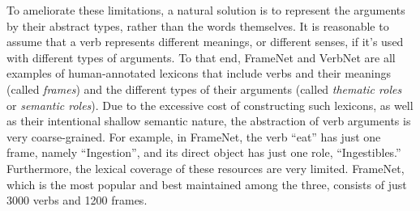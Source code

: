 To ameliorate these limitations, a natural solution is to represent the
arguments by their abstract types, rather than the words themselves.
It is reasonable to assume that a verb represents different meanings,
or different senses, if it's used with different types of arguments.
To that end, FrameNet\cite{baker1998berkeley} and VerbNet\cite{KipperDP00}
are all examples of human-annotated lexicons that include verbs and their
meanings (called {\em frames}) and the different types of
their arguments (called {\em thematic roles} or {\em semantic roles}).
Due to the excessive cost of constructing such
lexicons, as well as their intentional shallow semantic nature,
the abstraction of verb arguments is very coarse-grained. For example,
in FrameNet, the verb ``eat'' has just one frame, namely ``Ingestion'',
and its direct object has just one role, ``Ingestibles.''
Furthermore, the lexical coverage of these
resources are very limited. FrameNet, which is the most popular and best
maintained among the three, consists of just 3000 verbs and 1200
frames.


